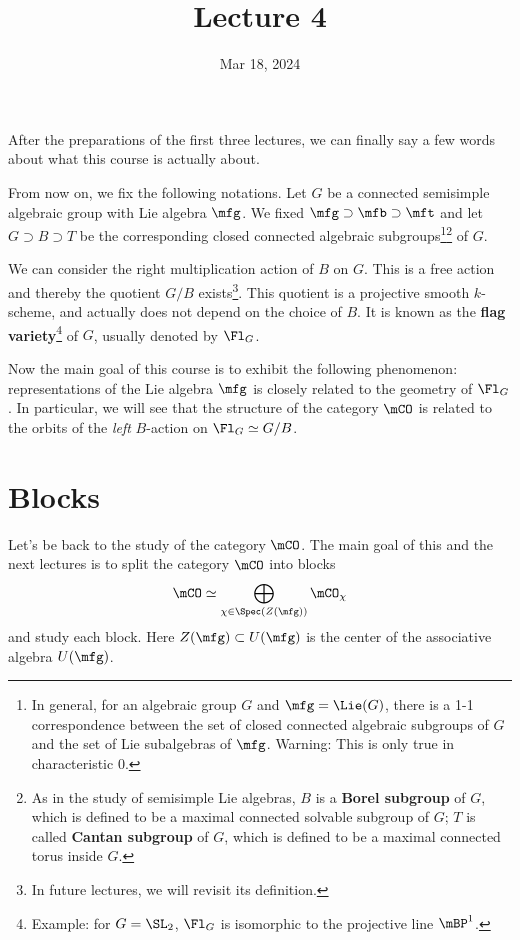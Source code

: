 





\title{Lecture 4}

\date{Mar 18, 2024}

\maketitle


	After the preparations of the first three lectures, we can finally say a few words about what this course is actually about.

	From now on, we fix the following notations. Let $G$ be a connected semisimple algebraic group with Lie algebra $\mfg$. We fixed $\mfg \supset \mfb \supset \mft$ and let $G\supset B \supset T$ be the corresponding closed connected algebraic subgroups\footnote{In general, for an algebraic group $G$ and $\mfg=\Lie(G)$, there is a 1-1 correspondence between the set of closed connected algebraic subgroups of $G$ and the set of Lie subalgebras of $\mfg$. Warning: This is only true in characteristic $0$.
	}\footnote{As in the study of semisimple Lie algebras, $B$ is a \textbf{Borel subgroup} of $G$, which is defined to be a maximal connected solvable subgroup of $G$; $T$ is called \textbf{Cantan subgroup} of $G$, which is defined to be a maximal connected torus inside $G$.} of $G$.

	We can consider the right multiplication action of $B$ on $G$. This is a free action and thereby the quotient $G/B$ exists\footnote{In future lectures, we will revisit its definition.}. This quotient is a projective smooth $k$-scheme, and actually does not depend on the choice of $B$. It is known as the \textbf{flag variety}\footnote{Example: for $G=\SL_2$, $\Fl_G$ is isomorphic to the projective line $\mBP^1$.} of $G$, usually denoted by $\Fl_G$.

	Now the main goal of this course is to exhibit the following phenomenon: representations of the Lie algebra $\mfg$ is closely related to the geometry of $\Fl_G$. In particular, we will see that the structure of the category $\mCO$ is related to the orbits of the \emph{left} $B$-action on $\Fl_G\simeq G/B$.


\section{Blocks}

	Let's be back to the study of the category $\mCO$. The main goal of this and the next lectures is to split the category $\mCO$ into blocks 
\[
	\mCO \simeq \bigoplus_{\chi\in \Spec(Z(\mfg))} \mCO_\chi
\]
and study each block. Here $Z(\mfg) \subset U(\mfg)$ is the center of the associative algebra $U(\mfg)$. 


